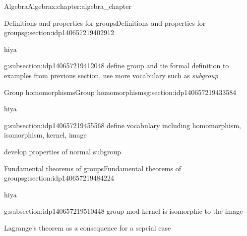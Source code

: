 \documentclass[oneside,10pt,]{book}
\numberwithin{equation}{section}
\begin{document}
\begin{chapterptx}{Algebra}{}{Algebra}{}{}{x:chapter:algebra_chapter}
\begin{sectionptx}{Definitions and properties for groups}{}{Definitions and properties for groups}{}{}{g:section:idp140657219402912}
\begin{introduction}{}%
hiya\end{introduction}%
%
%
\typeout{************************************************}
\typeout{************************************************}
%
\begin{subsectionptx}{}{}{}{}{}{g:subsection:idp140657219412048}
define group and tie formal definition to examples from previous section, use more vocabulary such as \emph{subgroup}%
\end{subsectionptx}
\end{sectionptx}
%
%
\typeout{************************************************}
\typeout{************************************************}
%
\begin{sectionptx}{Group homomorphisms}{}{Group homomorphisms}{}{}{g:section:idp140657219433584}
\begin{introduction}{}%
hiya\end{introduction}%
%
%
\typeout{************************************************}
\typeout{************************************************}
%
\begin{subsectionptx}{}{}{}{}{}{g:subsection:idp140657219455568}
define vocabulary including homomorphism, isomorphism, kernel, image%
\par
develop properties of normal subgroup%
\end{subsectionptx}
\end{sectionptx}
%
%
\typeout{************************************************}
\typeout{************************************************}
%
\begin{sectionptx}{Fundamental theorems of groups}{}{Fundamental theorems of groups}{}{}{g:section:idp140657219484224}
\begin{introduction}{}%
hiya\end{introduction}%
%
%
\typeout{************************************************}
\typeout{************************************************}
%
\begin{subsectionptx}{}{}{}{}{}{g:subsection:idp140657219510448}
group mod kernel is isomorphic to the image%
\par
Lagrange's theorem as a consequence for a sepcial case%
\end{subsectionptx}
\end{sectionptx}
%
%
\typeout{************************************************}

\end{chapterptx}
\end{document}
